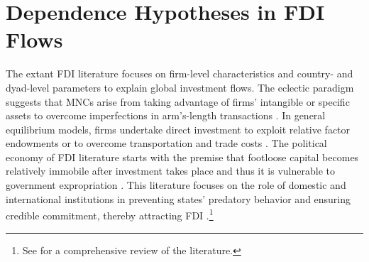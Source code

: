 \documentclass[reqno,onecolumn,letterpaper,12pt]{article}
\begin{document}


\section{Dependence Hypotheses in FDI Flows}

The extant FDI literature focuses on firm-level characteristics and country- and dyad-level parameters to explain global investment flows. The eclectic paradigm suggests that MNCs arise from taking advantage of firms' intangible or specific assets to overcome imperfections in arm's-length transactions \citep{Dunning:1988,Dunning:1992}. In general equilibrium models, firms undertake direct investment to exploit relative factor endowments or to overcome transportation and trade costs \citep{Helpman:1984,Carr_et_al:2001}. %
The political economy of FDI literature starts with the premise that footloose capital becomes relatively immobile after investment takes place and thus it is vulnerable to government expropriation \citep{Vernon:1971,Vernon:1980}. This literature focuses on the role of domestic and international institutions in preventing states' predatory behavior and ensuring credible commitment, thereby attracting FDI \citep[e.g.,][]{Henisz:2000,Jensen:2003,Jensen:2006,Li_Resnick:2003,Staats_Biglaiser:2012,Buthe_Milner:2008,Allee_Peinhardt:2011,Kerner:2009}.\footnote{See \citet{Pandya:2016} for a comprehensive review of the literature.}
\end{document}
